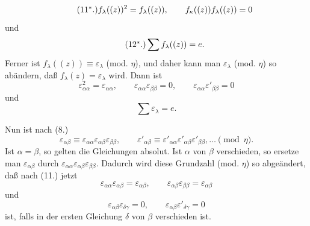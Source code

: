 \documentclass[11pt]{article}
\newcommand{\eps}{\varepsilon}
\begin{document}
\begin{equation}\tag{11$^{*}$.}
 f_\lambda((z))^2=f_\lambda((z)),
 \qquad
 f_\kappa((z))f_\lambda((z))=0
\end{equation}
und
\begin{equation}\tag{12$^{*}$.}
 \sum f_\lambda((z))=e.
\end{equation}
Ferner ist $f_\lambda((z))\equiv \eps_\lambda$ (mod. $\eta$), und daher kann man $\eps_\lambda$ (mod. $\eta$) so abändern, daß $f_\lambda(z)=\eps_\lambda$ wird. Dann ist
\begin{equation}\tag{11.}
 \eps_{\alpha\alpha}^2=\eps_{\alpha\alpha},
 \qquad
 \eps_{\alpha\alpha}\eps_{\beta\beta}=0,
 \qquad
 \eps_{\alpha\alpha}\eps'_{\beta\beta}=0
\end{equation}
und
\begin{equation}\tag{12.}
 \sum \eps_\lambda=e.
\end{equation}

Nun ist nach (8.)
\[
 \eps_{\alpha\beta}\equiv\eps_{\alpha\alpha}\eps_{\alpha\beta}\eps_{\beta\beta},
 \qquad
 \eps'_{\alpha\beta}\equiv\eps'_{\alpha\alpha}\eps'_{\alpha\beta}\eps'_{\beta\beta},\ldots
 \pmod{\eta}.
\]
Ist $\alpha=\beta$, so gelten die Gleichungen absolut. Ist $\alpha$ von $\beta$ verschieden, so ersetze man $\eps_{\alpha\beta}$ durch $\eps_{\alpha\alpha}\eps_{\alpha\beta}\eps_{\beta\beta}$. Dadurch wird diese Grundzahl (mod. $\eta$) so abgeändert, daß nach (11.) jetzt
\begin{equation}\tag{13.}
 \eps_{\alpha\alpha}\eps_{\alpha\beta}=\eps_{\alpha\beta},
 \qquad
 \eps_{\alpha\beta}\eps_{\beta\beta}=\eps_{\alpha\beta}
\end{equation}
und
\begin{equation}\tag{14.}
 \eps_{\alpha\beta}\eps_{\delta\gamma}=0,
 \qquad
 \eps_{\alpha\beta}\eps'_{\delta\gamma}=0
\end{equation}
ist, falls in der ersten Gleichung $\delta$ von $\beta$ verschieden ist.
\end{document}
